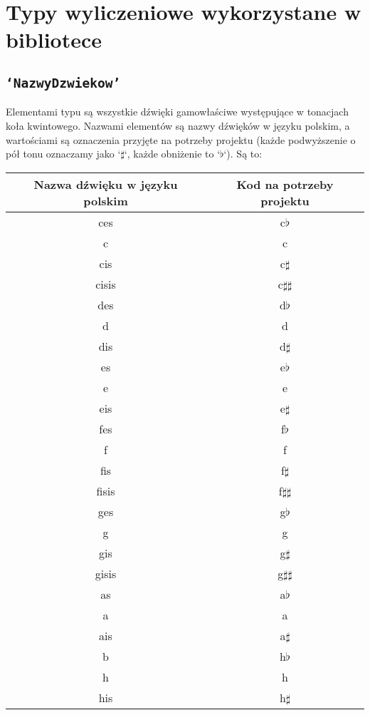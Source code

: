 \documentclass[dokumentacja.tex]{subfiles}
\begin{document}
\section{Typy wyliczeniowe wykorzystane w bibliotece}
\subsection{\texttt{`NazwyDzwiekow'}}
Elementami typu są wszystkie dźwięki gamowłaściwe występujące w tonacjach koła kwintowego. Nazwami elementów są nazwy dźwięków w języku polskim, a wartościami są oznaczenia przyjęte na potrzeby projektu (każde podwyższenie o pół tonu oznaczamy jako `$\sharp$`, każde obniżenie to `$\flat$`). Są to:
\begin{center}
\begin{tabular}{|c|c|}
    \hline
    \textbf{Nazwa dźwięku w języku polskim} & \textbf{Kod na potrzeby projektu} \\
    \hline
    ces & c$\flat$\\ \hline
    c & c \\ \hline
    cis & c$\sharp$ \\ \hline
    cisis & c$\sharp\sharp$ \\ \hline
    des & d$\flat$\\ \hline
    d & d \\ \hline
    dis & d$\sharp$ \\ \hline
    es & e$\flat$\\ \hline
    e & e \\ \hline
    eis & e$\sharp$ \\ \hline
    fes & f$\flat$\\ \hline
    f & f \\ \hline
    fis & f$\sharp$ \\ \hline
    fisis & f$\sharp\sharp$ \\ \hline
    ges & g$\flat$\\ \hline
    g & g \\ \hline
    gis & g$\sharp$ \\ \hline
    gisis & g$\sharp\sharp$ \\ \hline
    as & a$\flat$\\ \hline
    a & a \\ \hline
    ais & a$\sharp$ \\ \hline
    b & h$\flat$\\ \hline
    h & h \\ \hline
    his & h$\sharp$ \\
    \hline
\end{tabular}
\end{center}
\end{document}
